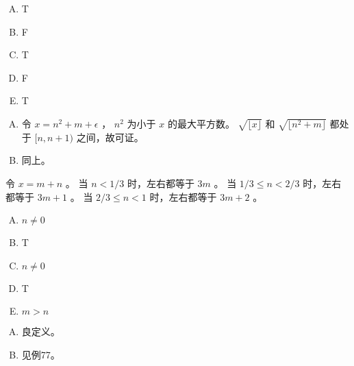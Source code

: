 {{        %
        \begin{practices}
            \begin{enumerate}[A.]
                \item T
                \item F
                \item T
                \item F
                \item T
            \end{enumerate}
        \end{practices}

        \begin{practices}
            \begin{enumerate}[A.]
                \item
                {
                    令 $x = n^2 + m + \epsilon$ ， $n^2$ 为小于 $x$ 的最大平方数。
                    $\sqrt{\lfloor x \rfloor}$ 和 $\sqrt{\lfloor n^2 + m \rfloor}$ 都处于 $[n, n+1)$ 之间，故可证。
                }
                \item
                {
                    同上。
                }
            \end{enumerate}
        \end{practices}

        \begin{practices}
            令 $x = m + n$ 。
            当 $n < 1 / 3$ 时，左右都等于 $3m$ 。
            当 $1 / 3 \leq n < 2 / 3$ 时，左右都等于 $3m + 1$ 。
            当 $2 / 3 \leq n < 1$ 时，左右都等于 $3m + 2$ 。
        \end{practices}

        \begin{practices}
            \begin{enumerate}[A.]
                \item $n \neq 0$
                \item T
                \item $n \neq 0$
                \item T
                \item $m > n$
            \end{enumerate}
        \end{practices}

        \begin{practices}
            \begin{enumerate}[A.]
                \item
                {
                    良定义。
                }
                \item
                {
                    见例77。
                }
            \end{enumerate}
        \end{practices}

}}

